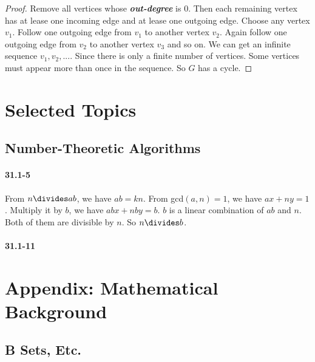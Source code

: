 \documentclass{book}
\begin{document}
\begin{CJK}{UTF8}{gkai}
\begin{proof}
  Remove all vertices whose \textit\textbf{out-degree} is $0$. Then each 
  remaining vertex has at lease one incoming edge and at lease one outgoing 
  edge. Choose any vertex $v_1$. Follow one outgoing edge from $v_1$ to another 
  vertex $v_2$.  Again follow one outgoing edge from $v_2$ to another vertex 
  $v_3$ and so on.  We can get an infinite sequence $v_1, v_2, ...$. Since there 
  is only a finite number of vertices. Some vertices must appear more than once 
  in the sequence.  So $G$ has a cycle.
\end{proof}

\part{Selected Topics}

\chapter{Number-Theoretic Algorithms}

\subsection*{31.1-5}
From $n \divides ab$, we have $ab=kn$. From gcd$(a, n)= 1$, we have $ax + ny = 
1$.  Multiply it by $b$, we have $abx + nby = b$. $b$ is a linear combination of 
$ab$ and $n$. Both of them are divisible by $n$. So $n\divides b$.

\subsection*{31.1-11}

\part{Appendix: Mathematical Background}

\chapter{B Sets, Etc.}

\end{CJK}
\end{document}
